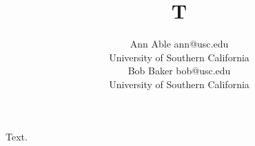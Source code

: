 \documentclass{article}
\title{T}
\author{\name Ann Able \email ann@usc.edu\\
      \addr
      University of Southern California
      \\
      \name Bob Baker \email  bob@usc.edu \\
     \addr
      University of Southern California}
\begin{document}
\maketitle
Text.
\end{document}
